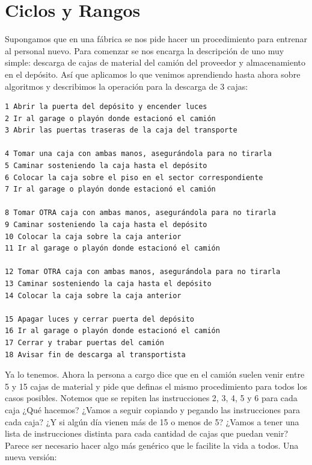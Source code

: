 \documentclass[
  letterpaper,
  DIV=11,
  numbers=noendperiod]{scrreprt}
\begin{document}
\section{Ciclos y Rangos}\label{ciclos-y-rangos}

Supongamos que en una fábrica se nos pide hacer un procedimiento para
entrenar al personal nuevo. Para comenzar se nos encarga la descripción
de uno muy simple: descarga de cajas de material del camión del
proveedor y almacenamiento en el depósito. Así que aplicamos lo que
venimos aprendiendo hasta ahora sobre algoritmos y describimos la
operación para la descarga de 3 cajas:

\begin{verbatim}
1 Abrir la puerta del depósito y encender luces 
2 Ir al garage o playón donde estacionó el camión 
3 Abrir las puertas traseras de la caja del transporte

4 Tomar una caja con ambas manos, asegurándola para no tirarla 
5 Caminar sosteniendo la caja hasta el depósito 
6 Colocar la caja sobre el piso en el sector correspondiente 
7 Ir al garage o playón donde estacionó el camión

8 Tomar OTRA caja con ambas manos, asegurándola para no tirarla 
9 Caminar sosteniendo la caja hasta el depósito 
10 Colocar la caja sobre la caja anterior 
11 Ir al garage o playón donde estacionó el camión

12 Tomar OTRA caja con ambas manos, asegurándola para no tirarla 
13 Caminar sosteniendo la caja hasta el depósito 
14 Colocar la caja sobre la caja anterior

15 Apagar luces y cerrar puerta del depósito 
16 Ir al garage o playón donde estacionó el camión 
17 Cerrar y trabar puertas del camión 
18 Avisar fin de descarga al transportista
\end{verbatim}

Ya lo tenemos. Ahora la persona a cargo dice que en el camión suelen
venir entre 5 y 15 cajas de material y pide que definas el mismo
procedimiento para todos los casos posibles. Notemos que se repiten las
instrucciones 2, 3, 4, 5 y 6 para cada caja ¿Qué hacemos? ¿Vamos a
seguir copiando y pegando las instrucciones para cada caja? ¿Y si algún
día vienen más de 15 o menos de 5? ¿Vamos a tener una lista de
instrucciones distinta para cada cantidad de cajas que puedan venir?
Parece ser necesario hacer algo más genérico que le facilite la vida a
todos. Una nueva versión:
\end{document}

